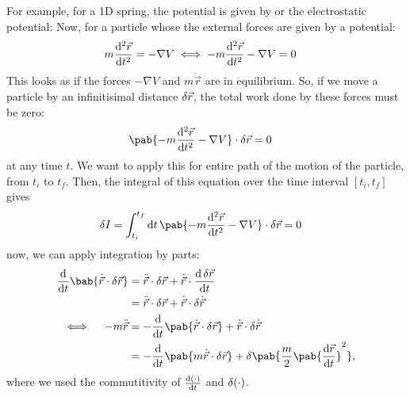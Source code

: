 For example, for a 1D spring, the potential is given by
or the electrostatic potential:
Now, for a particle whose the external forces are given by a potential:
\begin{align}
  m \odv[2]{\vec{r}}{t} & = - \nabla V \iff - m \odv[2]{\vec{r}}{t} - \nabla V = 0
\end{align}
This looks as if the forces $-\nabla V$ and $m \ddot{\vec{r}}$ are in equilibrium.
So, if we move a particle by an infinitisimal distance $\fdif{\vec{r}}$, the total work done by these forces must be zero:
\begin{align}
  \pab{- m \odv[2]{\vec{r}}{t} - \nabla V} \cdot \fdif{\vec{r}} & = 0
\end{align}
at any time $t$. We want to apply this for entire path of the motion of the particle, from $t_i$ to $t_f$.
Then, the integral of this equation over the time interval $[t_i, t_f]$ gives
\begin{align}
  \fdif{I} & = \int_{t_i}^{t_f} \odif{t} \, \pab{- m \odv[2]{\vec{r}}{t} - \nabla V} \cdot \fdif{\vec{r}} = 0 \label{eq:eom-variation}
\end{align}
now, we can apply integration by parts:
\begin{align}
  \odv{}{t} \bab{\dot{\vec{r}} \cdot \fdif{\vec{r}}}
   & = \ddot{\vec{r}} \cdot \fdif{\vec{r}} + \dot{\vec{r}} \cdot \odv{\fdif{\vec{r}}}{t}                           \\
   & = \ddot{\vec{r}} \cdot \fdif{\vec{r}} + \dot{\vec{r}} \cdot \fdif{\dot{\vec{r}}}                              \\
  \iff \quad - m \ddot{\vec{r}}
   & = - \odv{}{t} \pab{\dot{\vec{r}} \cdot \fdif{\vec{r}}} + \dot{\vec{r}} \cdot \fdif{\dot{\vec{r}}}             \\
   & = - \odv{}{t} \pab{m \dot{\vec{r}} \cdot \fdif{\vec{r}}} + \delta \pab{\frac{m}{2} \pab{\odv{\vec{r}}{t}}^2},
\end{align}
where we used the commutitivity of $\odv{(\cdot)}{t}$ and $\fdif{(\cdot)}$.
